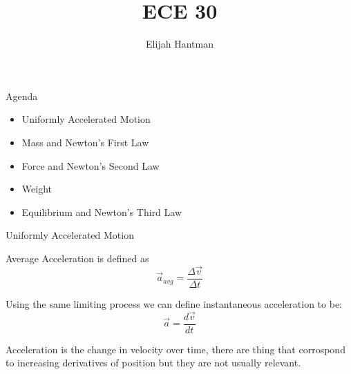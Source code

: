 \documentclass{report}
\title{\Huge{ECE 30}}
\author{\huge{Elijah Hantman}}
\date{}
\begin{document}
\maketitle
\newpage
\begin{description}
    \item {\large Agenda}
        \begin{itemize}
            \item Uniformly Accelerated Motion
            \item Mass and Newton's First Law
            \item Force and Newton's Second Law
            \item Weight
            \item Equilibrium and Newton's Third Law
        \end{itemize}
    \item {\large Uniformly Accelerated Motion}
        \begin{mdframed}
            \begin{center}
            \end{center} 

            Average Acceleration is defined as
            \begin{displaymath}
                \vec{a}_{avg} = \frac{\Delta \vec{v}}{\Delta t}
            \end{displaymath}

            Using the same limiting process we can define
            instantaneous acceleration to be:
            \begin{displaymath}
                \vec{a} = \frac{d\vec{v}}{dt}
            \end{displaymath}

            Acceleration is the change in velocity over time,
            there are thing that corrospond to increasing
            derivatives of position but they are not usually
            relevant.

            \begin{center}
            \end{center}


\end{mdframed}
\end{description}
\end{document}
